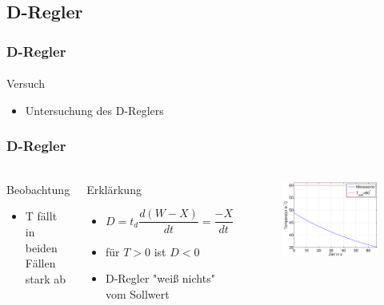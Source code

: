 \subsection{D-Regler} %
\label{sub:D-Regler}
\begin{frame}
    \frametitle{D-Regler}
    \framesubtitle{}
    \begin{block}{Versuch}
        \begin{itemize}
            \item Untersuchung des D-Reglers
        \end{itemize}
    \end{block}
\end{frame}
\begin{frame}
    \frametitle{D-Regler}
    \framesubtitle{}
    \begin{columns}[c]
        \begin{block}{Beobachtung}
            \begin{itemize}
                \item T fällt in beiden Fällen stark ab
            \end{itemize}
        \end{block}
        \begin{block}{Erklärkung}
            \begin{itemize}
                \item 
                \begin{equation*}
                    D = t_d \frac{d (W-X)}{dt} = \frac{-X}{dt}
                \end{equation*}
                \item für $T>0$ ist $D < 0$
                \item D-Regler "weiß nichts" vom Sollwert
            \end{itemize}
        \end{block}
            \begin{figure}[H]
            \begin{center}
                    \includegraphics[scale=0.3]{./img/plots/2_e_td_1.eps}

\end{center}
\end{figure}
\end{columns}
\end{frame}
